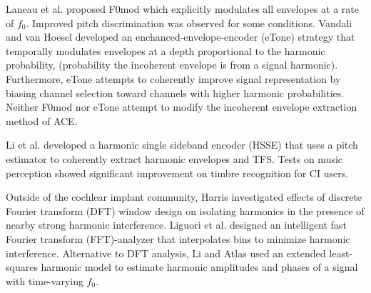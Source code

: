 \documentclass [11pt, proquest,oneside] {ganter_thesis}[2015/03/03]
\begin{document}
Laneau et al. \cite{laneau2006improved} proposed F0mod which explicitly modulates all envelopes at a rate of $f_0$.  Improved pitch discrimination was observed for some conditions.  Vandali and van Hoesel \cite{vandali2011development} developed an enchanced-envelope-encoder (eTone) strategy that temporally modulates envelopes at a depth proportional to the harmonic probability, (probability the incoherent envelope is from a signal harmonic).  Furthermore, eTone attempts to coherently improve signal representation by biasing channel selection toward channels with higher harmonic probabilities.  Neither F0mod nor eTone attempt to modify the incoherent envelope extraction method of ACE.

Li et al. \cite{li2010harmonic} developed a harmonic single sideband encoder (HSSE) that uses a pitch estimator to coherently extract harmonic envelopes and TFS.  Tests on music perception \cite{li2013improved} showed significant improvement on timbre recognition for CI users.

Outside of the cochlear implant community, Harris \cite{harris1978use} investigated effects of discrete Fourier transform (DFT) window design on isolating harmonics in the presence of nearby strong harmonic interference.  Liguori et al. \cite{liguori2004intelligent} designed an intelligent fast Fourier transform (FFT)-analyzer that interpolates bins to minimize harmonic interference.  Alternative to DFT analysis, Li and Atlas \cite{li2003time} used an extended least-squares harmonic model to estimate harmonic amplitudes and phases of a signal with time-varying $f_0$.





\end{document}

